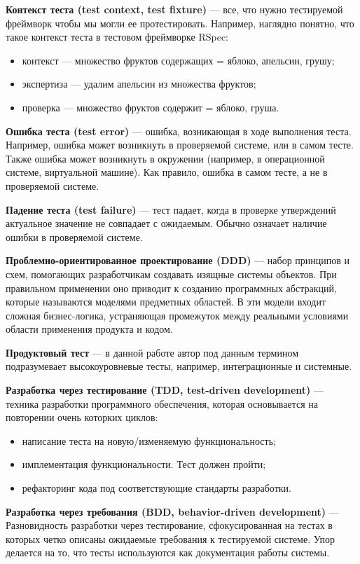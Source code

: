 {\bf Контекст теста (test context, test fixture)} ---
все, что нужно тестируемой фреймворк чтобы мы могли ее протестировать. Например, наглядно понятно, что такое контекст теста в тестовом фреймворке RSpec:

\begin{itemize}
\item контекст --- множество фруктов содержащих = {яблоко, апельсин, грушу};
\item экспертиза --- удалим апельсин из множества фруктов;
\item проверка --- множество фруктов содержит = {яблоко, груша}.
\end{itemize}

{\bf Ошибка теста (test error)} ---
ошибка, возникающая в ходе выполнения теста. Например, ошибка может возникнуть в проверяемой системе, или в самом тесте. Также ошибка может возникнуть в окружении (например, в операционной системе, виртуальной машине). Как правило, ошибка в самом тесте, а не в проверяемой системе.

{\bf Падение теста (test failure)} ---
тест падает, когда в проверке утверждений актуальное значение не совпадает с ожидаемым. Обычно означает наличие ошибки в проверяемой системе.

{\bf Проблемно-ориентированное проектирование (DDD)} --- набор принципов и схем, помогающих разработчикам создавать изящные системы объектов. При правильном применении оно приводит к созданию программных абстракций, которые называются моделями предметных областей. В эти модели входит сложная бизнес-логика, устраняющая промежуток между реальными условиями области применения продукта и кодом.

{\bf Продуктовый тест} --- в данной работе автор под данным термином подразумевает высокоуровневые тесты, например, интеграционные и системные.

{\bf Разработка через тестирование (TDD, test-driven development)} ---
техника разработки программного обеспечения, которая основывается на повторении очень которких циклов:

\begin{itemize}
\item написание теста на новую/изменяемую функциональность;
\item имплементация функциональности. Тест должен пройти;
\item рефакторинг кода под соответствующие стандарты разработки.
\end{itemize}

{\bf Разработка через требования (BDD, behavior-driven development)} ---
Разновидность разработки через тестирование, сфокусированная на тестах в которых четко описаны ожидаемые требования к тестируемой системе. Упор делается на то, что тесты используются как документация работы системы.

